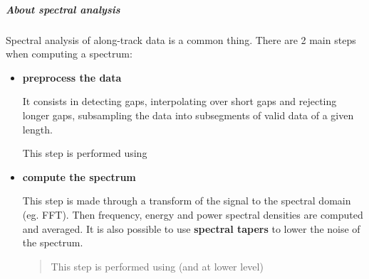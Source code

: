 \documentclass[letterpaper,10pt,english]{sphinxmanual}
\begin{document}
\subparagraph{About spectral analysis}
\label{altimetry.tools.spectrum:about-spectral-analysis}
Spectral analysis of along-track data is a common thing. There are 2 main steps when computing a spectrum:
\begin{itemize}
\item {} 
\textbf{preprocess the data}

It consists in detecting gaps, interpolating over short gaps and rejecting longer gaps, subsampling the data into subsegments of valid data of a given length.

This step is performed using {\hyperref[altimetry.tools.spectrum:altimetry.tools.spectrum.preprocess]{}}

\item {} 
\textbf{compute the spectrum}

This step is made through a transform of the signal to the spectral domain (eg. FFT). Then frequency, energy and power spectral densities are computed and averaged. It is also possible to use \textbf{spectral tapers} to lower the noise of the spectrum.
\begin{quote}

This step is performed using {\hyperref[altimetry.tools.spectrum:altimetry.tools.spectrum.spectral_analysis]{}} (and {\hyperref[altimetry.tools.spectrum:altimetry.tools.spectrum.get_spec]{}} at lower level)
\end{quote}

\end{itemize}
\end{document}
